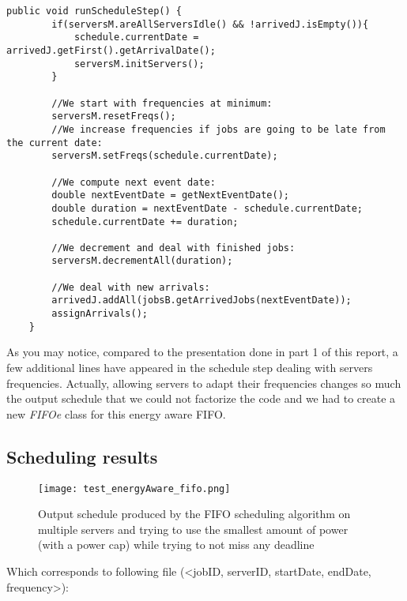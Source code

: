 \documentclass[./report.tex]{subfiles}
\begin{document}
\begin{lstlisting}[style=Java, caption={Source code of an energy aware FIFO adapted for multiple servers}]
	public void runScheduleStep() {
		if(serversM.areAllServersIdle() && !arrivedJ.isEmpty()){
			schedule.currentDate = arrivedJ.getFirst().getArrivalDate();
			serversM.initServers();
		}
		
		//We start with frequencies at minimum:
		serversM.resetFreqs();
		//We increase frequencies if jobs are going to be late from the current date:
		serversM.setFreqs(schedule.currentDate);
		
		//We compute next event date:
		double nextEventDate = getNextEventDate();
		double duration = nextEventDate - schedule.currentDate;
		schedule.currentDate += duration;
		
		//We decrement and deal with finished jobs:
		serversM.decrementAll(duration);
		
		//We deal with new arrivals:
		arrivedJ.addAll(jobsB.getArrivedJobs(nextEventDate));
		assignArrivals();
	}
\end{lstlisting}

As you may notice, compared to the presentation done in part 1 of this report, a few additional lines have appeared in the schedule step dealing with servers frequencies. Actually, allowing servers to adapt their frequencies changes so much the output schedule that we could not factorize the code and we had to create a new \textit{FIFOe} class for this energy aware FIFO.

\newpage
\subsection{Scheduling results}
\begin{figure}[!h]
	\center
	\texttt{[image: test\_energyAware\_fifo.png]}
	\caption{Output schedule produced by the FIFO scheduling algorithm on multiple servers and trying to use the smallest amount of power (with a power cap) while trying to not miss any deadline}
	\label{fig:energyAware_fifo} 
\end{figure}

Which corresponds to following file (<jobID, serverID, startDate, endDate, frequency>):


\newpage
\end{document}

